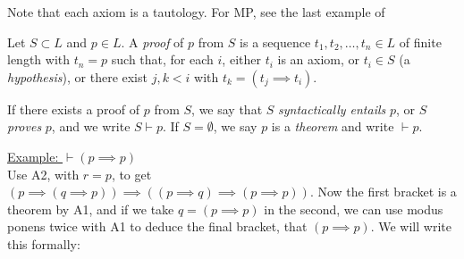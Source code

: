 \documentclass[10pt,a4paper]{article}
\begin{document}
Note that each axiom is a tautology. For MP, see the last example of \textbf{}

Let $S \subset L$ and $p \in L$. A \emph{proof} of $p$ from $S$ is a sequence $t_1, t_2, \ldots, t_n \in L$ of finite length with $t_n = p$ such that, for each $i$, either $t_i$ is an axiom, or $t_i \in S$ (a \emph{hypothesis}), or there exist $j, k < i$ with $t_k = (t_j \implies t_i)$.

If there exists a proof of $p$ from $S$, we say that $S$ \emph{syntactically entails} $p$, or $S$ \emph{proves} $p$, and we write $S \vdash p$. If $S = \emptyset$, we say $p$ is a \emph{theorem} and write $\vdash p$.

\underline{Example: $\vdash (p \implies p)$}\\
Use A2, with $r=p$, to get $(p \implies (q\implies p)) \implies ((p \implies q) \implies (p \implies p))$. Now the first bracket is a theorem by A1, and if we take $q = (p \implies p)$ in the second, we can use modus ponens twice with A1 to deduce the final bracket, that $(p \implies p)$. We will write this formally:
\end{document}
